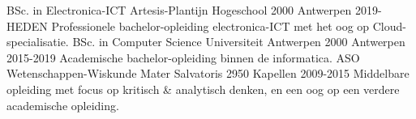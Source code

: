 
\begin{cventries}
  \cventry
    {BSc. in Electronica-ICT} %
    {Artesis-Plantijn Hogeschool} %
    {2000 Antwerpen} %
    {2019-HEDEN} %
    { Professionele bachelor-opleiding electronica-ICT met het oog op Cloud-specialisatie. }
  \cventry
    {BSc. in Computer Science} %
    {Universiteit Antwerpen} %
    {2000 Antwerpen} %
    {2015-2019} %
    { Academische bachelor-opleiding binnen de informatica. }
  \cventry
    {ASO Wetenschappen-Wiskunde} %
    {Mater Salvatoris} %
    {2950 Kapellen} %
    {2009-2015} %
    { Middelbare opleiding met focus op kritisch \& analytisch denken, en een oog op een verdere
academische opleiding. }
\end{cventries}
